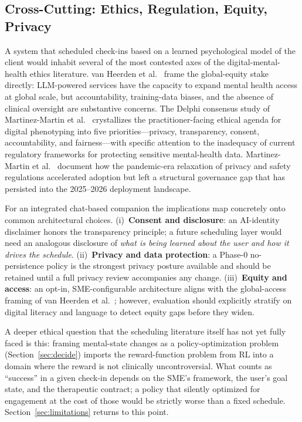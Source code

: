 \documentclass[11pt,a4paper]{article}
\newcommand{\secref}[1]{Section~\ref{#1}}
\begin{document}
\subsection{Cross-Cutting: Ethics, Regulation, Equity, Privacy}\label{sec:ethics-results}

A system that scheduled check-ins based on a learned psychological
model of the client would inhabit several of the most contested
axes of the digital-mental-health ethics literature. van Heerden et
al.~\cite{vanHeerden2023LLMGlobalMH} frame the global-equity stake
directly: LLM-powered services have the capacity to expand mental
health access at global scale, but accountability, training-data
biases, and the absence of clinical oversight are substantive
concerns. The Delphi consensus study of Martinez-Martin et
al.~\cite{MartinezMartin2021DigitalPhenotypingEthics} crystallizes
the practitioner-facing ethical agenda for digital phenotyping
into five priorities---privacy, transparency, consent,
accountability, and fairness---with specific attention to the
inadequacy of current regulatory frameworks for protecting
sensitive mental-health data. Martinez-Martin et
al.~\cite{MartinezMartin2020COVIDDigitalMHEthics} document how the
pandemic-era relaxation of privacy and safety regulations
accelerated adoption but left a structural governance gap that has
persisted into the 2025--2026 deployment landscape.

For an integrated chat-based companion the implications map
concretely onto common architectural choices.
(i)~\textbf{Consent and disclosure}: an AI-identity disclaimer
honors the transparency principle; a future scheduling layer
would need an analogous disclosure of \emph{what is being learned
about the user and how it drives the schedule}.
(ii)~\textbf{Privacy and data protection}: a Phase-0 no-persistence
policy is the strongest privacy posture available and should be
retained until a full privacy review accompanies any change.
(iii)~\textbf{Equity and access}: an opt-in,
SME-configurable architecture aligns with the global-access
framing of van Heerden et al.~\cite{vanHeerden2023LLMGlobalMH};
however, evaluation should explicitly stratify on digital literacy
and language to detect equity gaps before they widen.

A deeper ethical question that the scheduling literature itself
has not yet fully faced is this: framing mental-state changes as a
policy-optimization problem (\secref{sec:decide}) imports the
reward-function problem from RL into a domain where the reward is
not clinically uncontroversial. What counts as ``success'' in a
given check-in depends on the SME's framework, the user's goal
state, and the therapeutic contract; a policy that silently
optimized for engagement at the cost of those would be strictly
worse than a fixed schedule. \secref{sec:limitations} returns to
this point.
\end{document}
